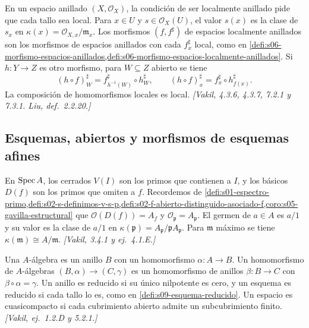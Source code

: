 \begin{defi}
\label{defi:s10-espacio-localmente-anillado}
En un espacio anillado \((X,\mathcal O_X)\), la condición de ser localmente anillado pide que cada tallo sea local. Para \(x\in U\) y \(s\in\mathcal O_X(U)\), el valor \(s(x)\) es la clase de \(s_x\) en \(\kappa(x)=\mathcal O_{X,x}/\mathfrak m_x\). Los morfismos \((f,f^\sharp)\) de espacios localmente anillados son los morfismos de espacios anillados con cada \(f_x^\sharp\) local, como en \cref{defi:s06-morfismo-espacios-anillados,defi:s06-morfismo-espacios-localmente-anillados}. Si \(h\colon Y\to Z\) es otro morfismo, para \(W\subseteq Z\) abierto se tiene
\[
 (h\circ f)_W^\sharp=f_{h^{-1}(W)}^\sharp\circ h_W^\sharp,
 \qquad (h\circ f)_x^\sharp=f_x^\sharp\circ h_{f(x)}^\sharp.
\]
La composición de homomorfismos locales es local. \emph{[Vakil, 4.3.6, 4.3.7, 7.2.1 y 7.3.1. Liu, def.~2.2.20.]}
\end{defi}

\subsection{Esquemas, abiertos y morfismos de esquemas afines}

\begin{defi}
\label{defi:s10-espectro-basicos-tallos}
En \(\operatorname{Spec} A\), los cerrados \(V(I)\) son los primos que contienen a \(I\), y los básicos \(D(f)\) son los primos que omiten a \(f\). Recordemos de \cref{defi:s01-espectro-primo,defi:s02-s-definimos-v-s-p,defi:s02-f-abierto-distinguido-asociado-f,coro:s05-gavilla-estructural} que \(\mathcal O(D(f))=A_f\) y \(\mathcal O_{\mathfrak p}=A_{\mathfrak p}\). El germen de \(a\in A\) es \(a/1\) y su valor es la clase de \(a/1\) en \(\kappa(\mathfrak p)=A_{\mathfrak p}/\mathfrak p A_{\mathfrak p}\). Para \(\mathfrak m\) máximo se tiene \(\kappa(\mathfrak m)\cong A/\mathfrak m\). \emph{[Vakil, 3.4.1 y ej.~4.1.E.]}
\end{defi}

\begin{defi}
\label{defi:s10-algebras-reducidos-cuasicompactos}
Una \(A\)-álgebra es un anillo \(B\) con un homomorfismo \(\alpha\colon A\to B\). Un homomorfismo de \(A\)-álgebras \((B,\alpha)\to(C,\gamma)\) es un homomorfismo de anillos \(\beta\colon B\to C\) con \(\beta\circ\alpha=\gamma\). Un anillo es reducido si su único nilpotente es cero, y un esquema es reducido si cada tallo lo es, como en \cref{defi:s09-esquema-reducido}. Un espacio es cuasicompacto si cada cubrimiento abierto admite un subcubrimiento finito. \emph{[Vakil, ej.~1.2.D y 5.2.1.]}
\end{defi}

